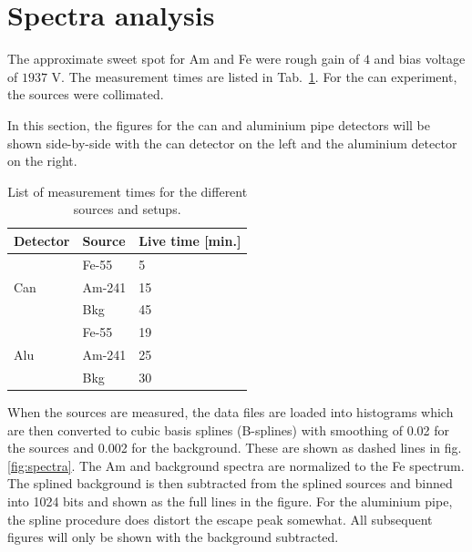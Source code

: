 \section{Spectra analysis}
The approximate sweet spot for Am and Fe were rough gain of $4$ and bias voltage of $1937$ V. The measurement times are listed in Tab.~\ref{tab:measurementstimes}. For the can experiment, the sources were collimated.

In this section, the figures for the can and aluminium pipe detectors will be shown side-by-side with the can detector on the left and the aluminium detector on the right.

\begin{table}[hb!]
\begin{tabular}{lll}
\textbf{Detector}    & \textbf{Source} & \textbf{Live time {[}min.{]}} \\ \hline
\multirow{3}{*}{Can} & Fe-55           & 5                          \\
                     & Am-241          & 15                         \\
                     & Bkg             & 45                         \\ \hline
\multirow{3}{*}{Alu} & Fe-55           & 19                         \\
                     & Am-241          & 25                         \\
                     & Bkg             & 30                         \\ \hline
\end{tabular}
\caption{List of measurement times for the different sources and setups.}
\label{tab:measurementstimes}
\end{table}

When the sources are measured, the data files are loaded into histograms which are then converted to cubic basis splines (B-splines) with smoothing of 0.02 for the sources and 0.002 for the background. These are shown as dashed lines in fig. \ref{fig:spectra}. The Am and background spectra are normalized to the Fe spectrum. The splined background is then subtracted from the splined sources and binned into 1024 bits and shown as the full lines in the figure. For the aluminium pipe, the spline procedure does distort the escape peak somewhat. All subsequent figures will only be shown with the background subtracted.

